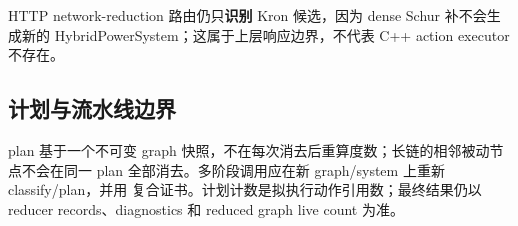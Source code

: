 HTTP network-reduction 路由仍只\textbf{识别} Kron 候选，因为 dense Schur 补不会生成新的
HybridPowerSystem；这属于上层响应边界，不代表 C++ action executor 不存在。

\subsection{计划与流水线边界}

plan 基于一个不可变 graph 快照，不在每次消去后重算度数；长链的相邻被动节点不会在同一 plan
全部消去。多阶段调用应在新 graph/system 上重新 classify/plan，并用
 复合证书。计划计数是拟执行动作引用数；最终结果仍以 reducer
records、diagnostics 和 reduced graph live count 为准。
